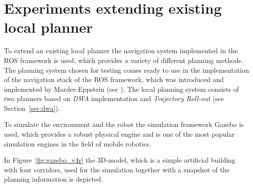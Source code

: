 \section{Experiments extending existing local planner}
To extend an existing local planner the navigation system implemented in the ROS framework is used, which provides a variety of different planning methods. 
The planning system chosen for testing comes ready to use in the implementation of the navigation stack of the ROS framework, which was introduced and implemented by Marder-Eppstein (see \cite{DBLP:conf/icra/Marder-EppsteinBFGK10}).
The local planning system consists of two planners based on \emph{DWA} implementation and \emph{Trajectory Roll-out} (see Section~\ref{sec:dwa}).

To simulate the environment and the robot the simulation framework Gazebo is used, which provides a robust physical engine and is one of the most popular simulation engines in the field of mobile robotics. 

In Figure~\ref{fig:gazebo_v4r} the 3D-model, which is a simple artificial building with four corridors, used for the simulation together with a snapshot of the planning information is depicted.

